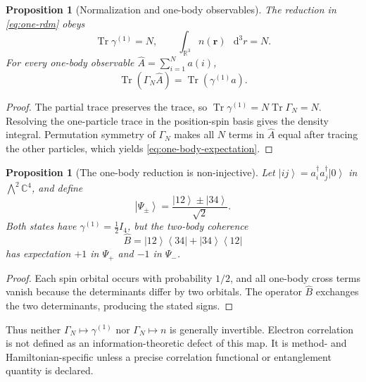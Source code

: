 \documentclass[11pt,a4paper]{article}
\theoremstyle{definition}
\theoremstyle{plain}
\newtheorem{proposition}[definition]{Proposition}
\theoremstyle{remark}
\newcommand{\R}{\mathbb{R}}
\newcommand{\C}{\mathbb{C}}
\newcommand{\dd}{\mathop{}\!\mathrm d}
\newcommand{\Tr}{\operatorname{Tr}}
\newcommand{\ket}[1]{\left\lvert #1\right\rangle}
\newcommand{\bra}[1]{\left\langle #1\right\rvert}
\begin{document}
\begin{proposition}[Normalization and one-body observables]
\label{prop:rdm-normalization}
The reduction in \cref{eq:one-rdm} obeys
\begin{equation}\label{eq:rdm-normalization}
\Tr\gamma^{(1)}=N,
\qquad
\int_{\R^3}n(\bm r)\,\dd^3r=N.
\end{equation}
For every one-body observable
\(\widehat A=\sum_{i=1}^N a(i)\),
\begin{equation}\label{eq:one-body-expectation}
\Tr(\Gamma_N\widehat A)=\Tr(\gamma^{(1)}a).
\end{equation}
\end{proposition}

\begin{proof}
The partial trace preserves the trace, so
\(\Tr\gamma^{(1)}=N\Tr\Gamma_N=N\).  Resolving the one-particle trace
in the position-spin basis gives the density integral.  Permutation
symmetry of \(\Gamma_N\) makes all \(N\) terms in \(\widehat A\)
equal after tracing the other particles, which yields
\cref{eq:one-body-expectation}.
\end{proof}

\begin{proposition}[The one-body reduction is non-injective]
\label{prop:rdm-noninjective}
Let \(\ket{ij}=a_i^\dagger a_j^\dagger\ket0\) in
\(\bigwedge^2\C^4\), and define
\[
\ket{\Psi_\pm}=\frac{\ket{12}\pm\ket{34}}{\sqrt2}.
\]
Both states have
\(\gamma^{(1)}=\tfrac12 I_4\), but the two-body coherence
\[
\widehat B=\ket{12}\!\bra{34}+\ket{34}\!\bra{12}
\]
has expectation \(+1\) in \(\Psi_+\) and \(-1\) in \(\Psi_-\).
\end{proposition}

\begin{proof}
Each spin orbital occurs with probability \(1/2\), and all one-body
cross terms vanish because the determinants differ by two orbitals.
The operator \(\widehat B\) exchanges the two determinants, producing
the stated signs.
\end{proof}

Thus neither \(\Gamma_N\mapsto\gamma^{(1)}\) nor
\(\Gamma_N\mapsto n\) is generally invertible.  Electron correlation
is not defined as an information-theoretic defect of this map.  It is
method- and Hamiltonian-specific unless a precise correlation
functional or entanglement quantity is declared.
\end{document}
